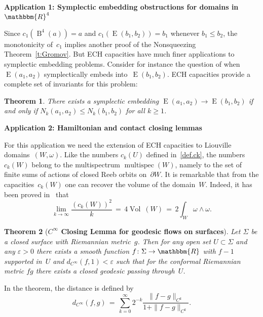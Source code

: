 \documentclass[12pt,twoside]{amsart}
\theoremstyle{plain}
\newtheorem{theorem}{Theorem}[section]
\numberwithin{figure}{section}
\numberwithin{equation}{section}
\def\s{\smallskip}
\def\Vol{\operatorname {Vol}\:\!}
\def\multispec{\operatorname{multispec}}
\def\gve{\varepsilon}
\def\B{\operatorname{B}}
\def\E{\operatorname{E}}
\def\RR{\mathbbm{R}}
\def\pp{\partial}
\def\ni{\noindent}
\def\b{\bigskip}
\begin{document}
\ni
{\bf Application 1: Symplectic embedding obstructions for domains in~$\RR^4$}

\s 
\ni
Since $c_1(\B^4(a)) = a$ and $c_1(\E(b_1,b_2)) = b_1$ whenever $b_1 \leqslant b_2$,
the monotonicity of~$c_1$ implies another proof of the Nonsqueezing Theorem~\ref{t:Gromov}.
But ECH capacities have much finer applications to symplectic embedding problems.
Consider for instance the question of when $\E(a_1,a_2)$ symplectically embeds into~$\E(b_1,b_2)$.
ECH capacities provide a complete set of invariants for this problem:

\begin{theorem} \label{t:ellsharp}
There exists a symplectic embedding
$\E (a_1,a_2) \to \E (b_1,b_2)$ if and only if $N_k (a_1,a_2) \leqslant N_k (b_1,b_2)$ for all $k \geqslant 1$.
\end{theorem}


\b \ni
{\bf Application 2: Hamiltonian and contact closing lemmas}

\s \ni
For this application we need the extension of ECH capacities to Liouville domains~$(W,\omega)$.
Like the numbers $c_k(U)$ defined in~\eqref{def.ck}, the numbers $c_k(W)$ belong to the
multispectrum $\multispec (W)$, namely to the set of finite sums of actions of
closed Reeb orbits on~$\pp W$.
It is remarkable that from the capacities~$c_k(W)$ one can recover the volume of the domain~$W$.
Indeed, it has been proved in~\cite{CHR15} that
%
\begin{equation} \label{e:ckvol}
\lim_{k \to \infty} \frac{(c_k(W))^2}{k} \,=\, 4  \Vol (W) \,=\, 2 \int_W \omega \wedge \omega .
\end{equation}

\begin{theorem} 
[\bf $C^\infty$ Closing Lemma for geodesic flows on surfaces]  \label{t:Irie1}
Let $\Sigma$ be a closed surface with Riemannian metric~$g$.
Then for any open set $U \subset \Sigma$ and any $\gve >0$ there exists a 
smooth function $f \colon \Sigma \to \RR$ with $f-1$ supported in~$U$ and $d_{C^\infty} (f,1) < \gve$ 
such that for the conformal Riemannian metric $f g$ there exists a closed geodesic passing through~$U$. 
\end{theorem}

In the theorem, the distance is defined by
$$
d_{C^\infty} (f,g) \,=\, \sum_{k=0}^\infty 2^{-k}  \frac{\|f-g\|_{C^k}}{1+\|f-g\|_{C^k}} .
$$
\end{document}
